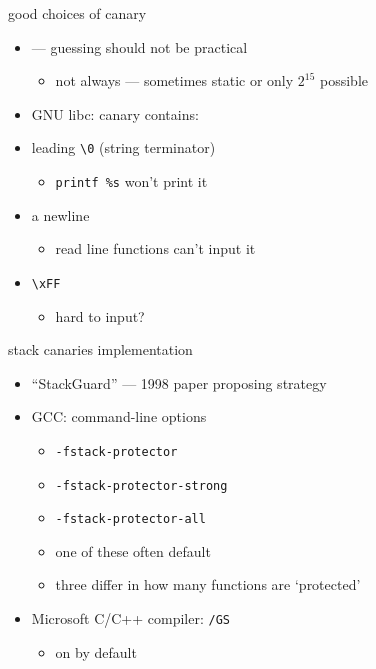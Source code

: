 \begin{frame}{good choices of canary}
\begin{itemize}
\item {} --- guessing should not be practical
    \begin{itemize}
    \item not always --- sometimes static or only $2^{15}$ possible
    \end{itemize}
\item GNU libc: canary contains:
\vspace{.5cm}
    \item leading {\tt \textbackslash 0} (string terminator)
        \begin{itemize}
        \item {\tt printf \%s} won't print it
        \end{itemize}
    \item a newline
        \begin{itemize}
        \item read line functions can't input it
        \end{itemize}
    \item {\tt \textbackslash xFF}
        \begin{itemize}
        \item hard to input?
        \end{itemize}
\end{itemize}
\end{frame}

\begin{frame}{stack canaries implementation}
    \begin{itemize}
    \item ``StackGuard'' --- 1998 paper proposing strategy
    \item GCC: command-line options
        \begin{itemize}
        \item {\tt -fstack-protector} 
        \item {\tt -fstack-protector-strong} 
        \item {\tt -fstack-protector-all}
        \item one of these often default
        \item three differ in how many functions are `protected'
        \end{itemize}
    \item Microsoft C/C++ compiler: {\tt /GS}
        \begin{itemize}
        \item on by default
        \end{itemize}
    \end{itemize}
\end{frame}

